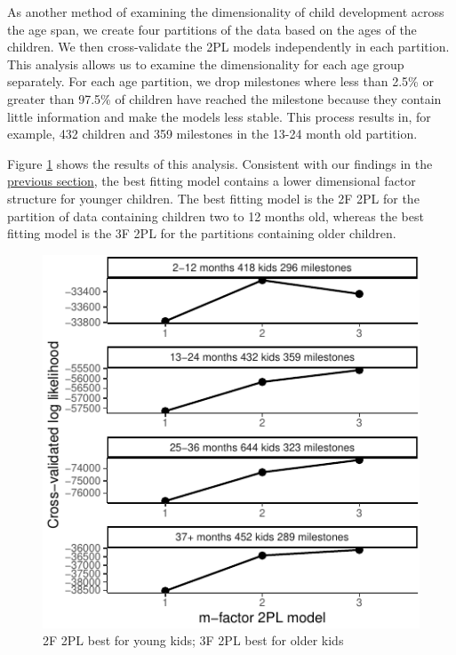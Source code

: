 \documentclass[10pt, letterpaper]{article}
\newenvironment{CodeChunk}{}{}
\begin{document}
As another method of examining the dimensionality of child development
across the age span, we create four partitions of the data based on the
ages of the children. We then cross-validate the 2PL models
independently in each partition. This analysis allows us to examine the
dimensionality for each age group separately. For each age partition, we
drop milestones where less than 2.5\% or greater than 97.5\% of children
have reached the milestone because they contain little information and
make the models less stable. This process results in, for example, 432
children and 359 milestones in the 13-24 month old partition.

Figure \ref{fig:partage} shows the results of this analysis. Consistent
with our findings in the \protect\hyperlink{full}{previous section}, the
best fitting model contains a lower dimensional factor structure for
younger children. The best fitting model is the 2F 2PL for the partition
of data containing children two to 12 months old, whereas the best
fitting model is the 3F 2PL for the partitions containing older
children.

\begin{CodeChunk}
\begin{figure}[tb]
\includegraphics{figs/partage-1} \caption[2F 2PL best for young kids]{2F 2PL best for young kids; 3F 2PL best for older kids}\label{fig:partage}
\end{figure}
\end{CodeChunk}
\end{document}
